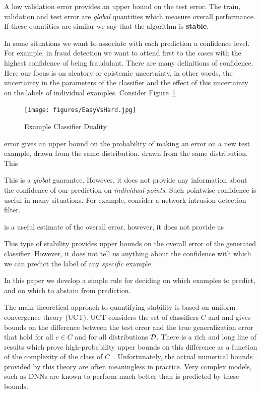 \documentclass{article}
\begin{document}
A low
validation error provides an upper bound on the test error.  The
train, validation and test error are {\em global} quantities which
measure overall performance. If these quantities are similar we say
that the algorithm is {\bf stable}.

In some situations we want to associate with each prediction a
confidence level. For example, in fraud detection we want to attend
first to the cases with the highest confidence of being fraudulant.
There are many definitions of confidence. Here our focus is on
aleatory or epistemic uncertainty, in other words, the uncertainty in
the parameters of the classifier and the effect of this uncertainty on
the labels of individual examples. Consider Figure~\ref{fig:duality} 

\begin{figure}[h]
\begin{center}
\texttt{[image: figures/EasyVsHard.jpg]}
\end{center}
\caption{Example Classifier Duality}
\label{fig:duality}
\end{figure}

error gives an upper bound on the probability of making an
error on a new test example, drawn from the same distribution.
drawn from the same distribution. This 

This is a {\em global}
guarantee. However, it does not provide any information about the
confidence of our prediction on {\em individual points}. Such
pointwise confidence is useful in many situations. For example,
consider a network intrusion detection filter.  

is a useful estimate of the
overall error, however, it does not provide us 

This type of stability provides upper bounds on the overall error of the
generated classifier. However, it does not tell us anything about the
confidence with which we can predict the label of any {\em specific} example.

In this paper we develop a simple rule for deciding on which examples
to predict, and on which to abstain from prediction.

\iffalse
The main theoretical approach to quantifying stability is based on
uniform convergence theory (UCT). UCT considers the set of classifiers
$C$ and and gives bounds on the difference between the test error and
the true generalization error that hold for all $c \in C$ and for all
distributions ${\cal D}$.  There is a
rich and long line of results which prove high-probability upper
bounds on this difference as a function of the complexity of the class
of $C$~\cite{BartlettLugosiReview}. Unfortunately, the actual
numerical bounds provided by this theory are often meaningless in
practice. Very complex models, such as DNNs are known to perform much
better than is predicted by these bounds.
\end{document}
